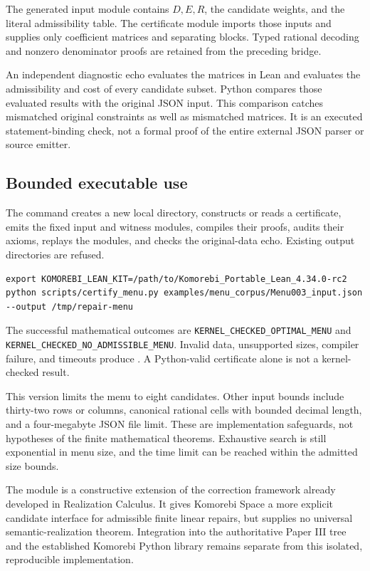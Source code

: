The generated input module contains $D,E,R$, the candidate weights, and the literal admissibility table. The certificate module imports those inputs and supplies only coefficient matrices and separating blocks. Typed rational decoding and nonzero denominator proofs are retained from the preceding bridge.

An independent diagnostic echo evaluates the matrices in Lean and evaluates the admissibility and cost of every candidate subset. Python compares those evaluated results with the original JSON input. This comparison catches mismatched original constraints as well as mismatched matrices. It is an executed statement-binding check, not a formal proof of the entire external JSON parser or source emitter.

\subsection{Bounded executable use}

The command  creates a new local directory, constructs or reads a certificate, emits the fixed input and witness modules, compiles their proofs, audits their axioms, replays the modules, and checks the original-data echo. Existing output directories are refused.

\begin{Verbatim}[fontsize=\small,breaklines=true]
export KOMOREBI_LEAN_KIT=/path/to/Komorebi_Portable_Lean_4.34.0-rc2
python scripts/certify_menu.py examples/menu_corpus/Menu003_input.json --output /tmp/repair-menu
\end{Verbatim}

The successful mathematical outcomes are \nolinkurl{KERNEL_CHECKED_OPTIMAL_MENU} and \nolinkurl{KERNEL_CHECKED_NO_ADMISSIBLE_MENU}. Invalid data, unsupported sizes, compiler failure, and timeouts produce . A Python-valid certificate alone is not a kernel-checked result.

This version limits the menu to eight candidates. Other input bounds include thirty-two rows or columns, canonical rational cells with bounded decimal length, and a four-megabyte JSON file limit. These are implementation safeguards, not hypotheses of the finite mathematical theorems. Exhaustive search is still exponential in menu size, and the time limit can be reached within the admitted size bounds.

The module is a constructive extension of the correction framework already developed in Realization Calculus. It gives Komorebi Space a more explicit candidate interface for admissible finite linear repairs, but supplies no universal semantic-realization theorem. Integration into the authoritative Paper III tree and the established Komorebi Python library remains separate from this isolated, reproducible implementation.

